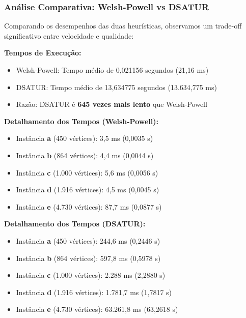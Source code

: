 \documentclass[12pt]{article}
\begin{document}


\subsubsection{Análise Comparativa: Welsh-Powell vs DSATUR}

Comparando os desempenhos das duas heurísticas, observamos um trade-off significativo entre velocidade e qualidade:

\textbf{Tempos de Execução:}

\begin{itemize}
    \item Welsh-Powell: Tempo médio de 0,021156 segundos (21,16 ms)
    \item DSATUR: Tempo médio de 13,634775 segundos (13.634,775 ms)
    \item Razão: DSATUR é \textbf{645 vezes mais lento} que Welsh-Powell
\end{itemize}

\textbf{Detalhamento dos Tempos (Welsh-Powell):}

\begin{itemize}
    \item Instância \textbf{a} (450 vértices): 3,5 ms (0,0035 s)
    \item Instância \textbf{b} (864 vértices): 4,4 ms (0,0044 s)
    \item Instância \textbf{c} (1.000 vértices): 5,6 ms (0,0056 s)
    \item Instância \textbf{d} (1.916 vértices): 4,5 ms (0,0045 s)
    \item Instância \textbf{e} (4.730 vértices): 87,7 ms (0,0877 s)
\end{itemize}

\textbf{Detalhamento dos Tempos (DSATUR):}

\begin{itemize}
    \item Instância \textbf{a} (450 vértices): 244,6 ms (0,2446 s)
    \item Instância \textbf{b} (864 vértices): 597,8 ms (0,5978 s)
    \item Instância \textbf{c} (1.000 vértices): 2.288 ms (2,2880 s)
    \item Instância \textbf{d} (1.916 vértices): 1.781,7 ms (1,7817 s)
    \item Instância \textbf{e} (4.730 vértices): 63.261,8 ms (63,2618 s)
\end{itemize}
\end{document}
